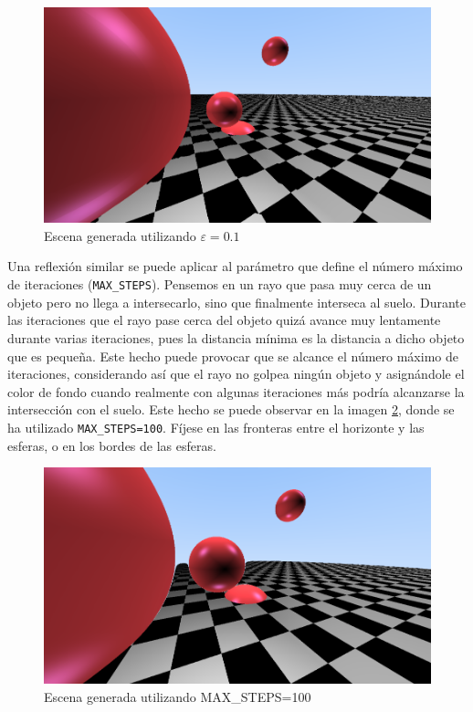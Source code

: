 \begin{figure} [ht]
    \centering
    \includegraphics[scale = 0.3]{img/C8/epsilon-grande.png}
    \caption{Escena generada utilizando $\varepsilon=0.1$}
    \label{fig:epsilon-grande}
\end{figure}

Una reflexión similar se puede aplicar al parámetro que define el número máximo de iteraciones (\verb|MAX_STEPS|). Pensemos en un rayo que pasa muy cerca de un objeto pero no llega a intersecarlo, sino que finalmente interseca al suelo. Durante las iteraciones que el rayo pase cerca del objeto quizá avance muy lentamente durante varias iteraciones, pues la distancia mínima es la distancia a dicho objeto que es pequeña. Este hecho puede provocar que se alcance el número máximo de iteraciones, considerando así que el rayo no golpea ningún objeto y asignándole el color de fondo cuando realmente con algunas iteraciones más podría alcanzarse la intersección con el suelo. Este hecho se puede observar en la imagen \ref{fig:pocas-iteraciones}, donde se ha utilizado \verb|MAX_STEPS=100|. Fíjese en las fronteras entre el horizonte y las esferas, o en los bordes de las esferas.

\begin{figure} [ht]
    \centering
    \includegraphics[scale = 0.3]{img/C8/pocas-iteraciones.png}
    \caption{Escena generada utilizando MAX\_STEPS=100}
    \label{fig:pocas-iteraciones}
\end{figure}

